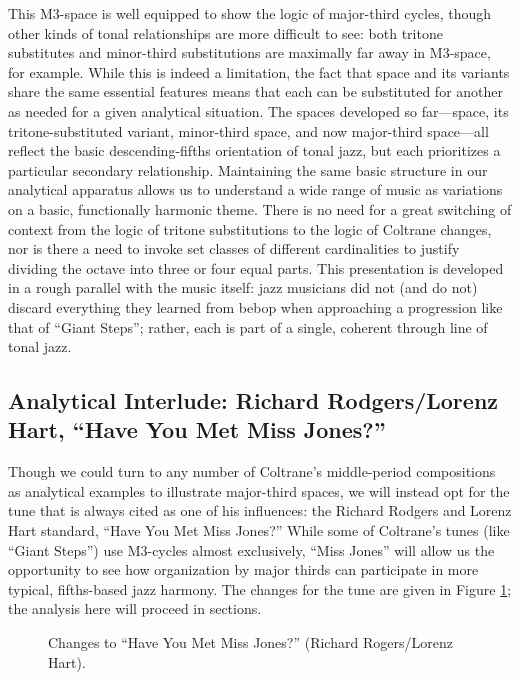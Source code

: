 This M3-space is well equipped to show the logic of major-third cycles, though
other kinds of tonal relationships are more difficult to see: both tritone
substitutes and minor-third substitutions are maximally far away in M3-space,
for example. While this is indeed a limitation, the fact that \tf space and
its variants share the same essential features means that each can be substituted
for another as needed for a given analytical situation. The spaces developed
so far---\tf space, its tritone-substituted variant, minor-third space, and
now major-third space---all reflect the basic descending-fifths orientation
of tonal jazz, but each prioritizes a particular secondary
relationship. Maintaining the same basic structure in our
analytical apparatus allows us to understand a wide range of music as
variations on a basic, functionally harmonic theme. There is no need for a
great switching of context from the logic of tritone substitutions to the logic
of Coltrane changes, nor is there a need to invoke set classes of different
cardinalities to justify dividing the octave into three or four equal parts.
This presentation is developed in a rough parallel with the music itself: jazz
musicians did not (and do not) discard everything they learned from bebop when
approaching a progression like that of ``Giant Steps''; rather, each is part
of a single, coherent through line of tonal jazz.

\subsection{Analytical Interlude: Richard Rodgers/Lorenz Hart, “Have You Met
  Miss Jones?”}
\label{subsec:miss-jones}

Though we could turn to any number of Coltrane's middle-period compositions as
analytical examples to illustrate major-third spaces, we will instead opt for
the tune that is always cited as one of his influences: the Richard Rodgers
and Lorenz Hart standard, ``Have You Met Miss Jones?'' While some of
Coltrane's tunes (like ``Giant Steps'') use M3-cycles almost exclusively,
``Miss Jones'' will allow us the opportunity to see how organization by major
thirds can participate in more typical, fifths-based jazz harmony. The changes
for the tune are given in Figure \ref{maj3:miss-jones-changes}; the analysis
here will proceed in sections.

\begin{figure}[tbp]
  \caption{Changes to ``Have You Met Miss Jones?'' (Richard Rogers/Lorenz Hart).}
\label{maj3:miss-jones-changes}
\end{figure}


